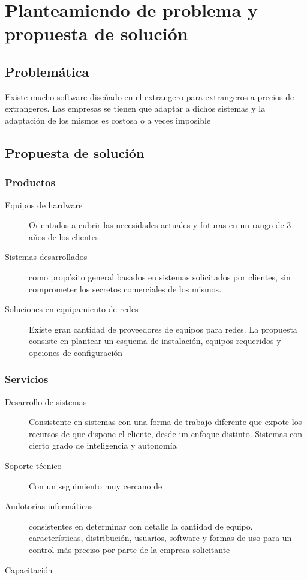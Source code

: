 \documentclass[12pt,spanish,lettersize]{report}
\begin{document}
\chapter{Planteamiendo de problema y propuesta de soluci\'on}
\section{Problem\'atica}
Existe mucho software dise\~nado en el extrangero para extrangeros a precios de extrangeros. Las empresas se tienen que adaptar a dichos sistemas y la adaptaci\'on de los mismos es costosa o a veces imposible
\section{Propuesta de soluci\'on}
\subsection{Productos}
\begin{description}
\item[Equipos de hardware] Orientados a cubrir las necesidades actuales y futuras en un rango de 3 a\~nos de los clientes.
\item[Sistemas desarrollados] como prop\'osito general basados en sistemas solicitados por clientes, sin comprometer los secretos comerciales de los mismos.
\item[Soluciones en equipamiento de redes] Existe gran cantidad de proveedores de equipos para redes. La propuesta consiste en plantear un esquema de instalaci\'on, equipos requeridos y opciones de configuraci\'on
\end{description}
\subsection{Servicios}
\begin{description}
\item[Desarrollo de sistemas] Consistente en sistemas con una forma de trabajo diferente que expote los recursos de que dispone el cliente, desde un enfoque distinto. Sistemas con cierto grado de inteligencia y autonom\'ia
\item[Soporte t\'ecnico] Con un seguimiento muy cercano de
\item[Audotor\'ias inform\'aticas] consistentes en determinar con detalle la cantidad de equipo, caracter\'isticas, distribuci\'on, usuarios, software y formas de uso para un control m\'as preciso por parte de la empresa solicitante
\item[Capacitaci\'on]
\end{description}
\end{document}
